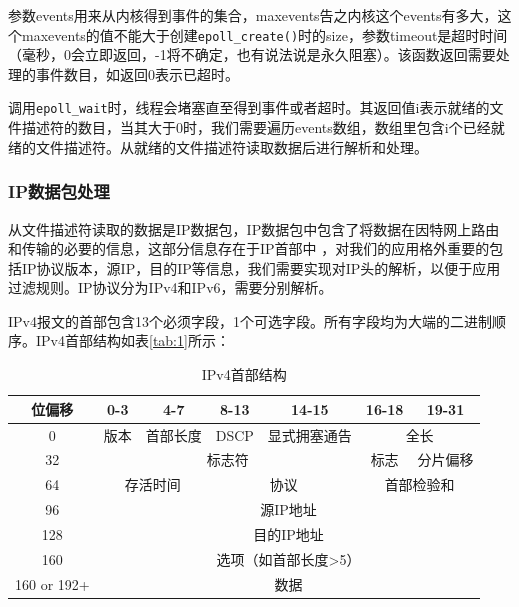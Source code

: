 \documentclass[format=final, language=chinese, degree=fyp]{hustthesis}
\begin{document}
\begin{enumerate}
参数events用来从内核得到事件的集合，maxevents告之内核这个events有多大，这个maxevents的值不能大于创建\verb|epoll_create()|时的size，参数timeout是超时时间（毫秒，0会立即返回，-1将不确定，也有说法说是永久阻塞）。该函数返回需要处理的事件数目，如返回0表示已超时。

调用\verb|epoll_wait|时，线程会堵塞直至得到事件或者超时。其返回值i表示就绪的文件描述符的数目，当其大于0时，我们需要遍历events数组，数组里包含i个已经就绪的文件描述符。从就绪的文件描述符读取数据后进行解析和处理。
\end{enumerate}

\subsubsection{IP数据包处理}


从文件描述符读取的数据是IP数据包，IP数据包中包含了将数据在因特网上路由和传输的必要的信息，这部分信息存在于IP首部中
，对我们的应用格外重要的包括IP协议版本，源IP，目的IP等信息，我们需要实现对IP头的解析，以便于应用过滤规则。IP协议分为IPv4和IPv6，需要分别解析。

IPv4报文的首部包含13个必须字段，1个可选字段。所有字段均为大端的二进制顺序。IPv4首部结构如表\autoref{tab:1}所示：

\begin{table}[h!]
\centering
\caption{IPv4首部结构}\label{tab:1}
\begin{tabular}{|c|c|c|c|c|c|c|}
	\hline
	位偏移 & 0-3 & 4-7 & 8-13 & 14-15 & 16-18 & 19-31\\
	\hline
	0 & 版本 & 首部长度 & DSCP & 显式拥塞通告 & \multicolumn{2}{c|}{全长}\\
	\hline
	32 & \multicolumn{4}{c|}{标志符} & 标志 & 分片偏移 \\
	\hline
	64 & \multicolumn{2}{c|}{存活时间}& \multicolumn{2}{c|}{协议}& \multicolumn{2}{c|}{首部检验和} \\
	\hline
	96 & \multicolumn{6}{c|}{源IP地址} \\
	\hline
	128 & \multicolumn{6}{c|}{目的IP地址} \\
	\hline
	160 & \multicolumn{6}{c|}{选项（如首部长度>5）} \\
	\hline
	160 or 192+ & \multicolumn{6}{c|}{数据}\\
	\hline
\end{tabular}
\end{table}
\end{document}
